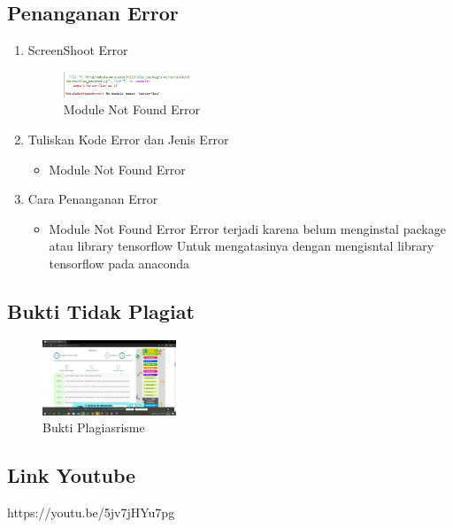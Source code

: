 \subsection{Penanganan Error}
\begin{enumerate}
\item ScreenShoot Error
	\begin{figure}[H]
		\includegraphics[width=4cm]{figures/1174054/7/error.png}
		\centering
		\caption{Module Not Found Error}
	\end{figure}

	\item Tuliskan Kode Error dan Jenis Error
	\begin{itemize}
		\item Module Not Found Error

	\end{itemize}
	\item Cara Penanganan Error
	\begin{itemize}
		\item Module Not Found Error
		\hfill\break
		Error terjadi karena belum menginstal package atau library tensorflow Untuk mengatasinya dengan mengisntal library tensorflow pada anaconda
	\end{itemize}
\end{enumerate}


\subsection{Bukti Tidak Plagiat}
\begin{figure}[H]
	\includegraphics[width=4cm]{figures/1174054/7/plagiarisme.png}
	\centering
	\caption{Bukti Plagiasrisme}
\end{figure}

\subsection{Link Youtube}
https://youtu.be/5jv7jHYu7pg